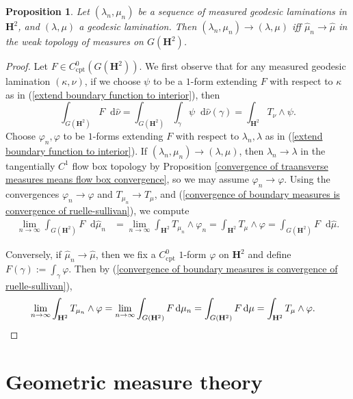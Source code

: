 \documentclass[reqno,11pt]{amsart}
\newcommand{\Hyp}{\mathbf H}
\newcommand*\dif{\mathop{}\!\mathrm{d}}
\newcommand{\cpt}{\mathrm{cpt}}
\newtheorem{proposition}[theorem]{Proposition}
\theoremstyle{definition}
\numberwithin{equation}{section}
\begin{document}
\begin{proposition}
Let $(\lambda_n, \mu_n)$ be a sequence of measured geodesic laminations in $\Hyp^2$, and $(\lambda, \mu)$ a geodesic lamination.
Then $(\lambda_n, \mu_n) \to (\lambda, \mu)$ iff $\hat \mu_n \to \hat \mu$ in the weak topology of measures on $G(\Hyp^2)$.
\end{proposition}
\begin{proof}
Let $F \in C^0_\cpt(G(\Hyp^2))$.
We first observe that for any measured geodesic lamination $(\kappa, \nu)$, if we choose $\psi$ to be a $1$-form extending $F$ with respect to $\kappa$ as in (\ref{extend boundary function to interior}), then 
\begin{equation}\label{convergence of boundary measures is convergence of ruelle-sullivan}
\int_{G(\Hyp^2)} F \dif \hat \nu = \int_{G(\Hyp^2)} \int_\gamma \psi \dif \hat \nu(\gamma) = \int_{\Hyp^2} T_\nu \wedge \psi.
\end{equation}
Choose $\varphi_n, \varphi$ to be $1$-forms extending $F$ with respect to $\lambda_n, \lambda$ as in (\ref{extend boundary function to interior}).
If $(\lambda_n, \mu_n) \to (\lambda, \mu)$, then $\lambda_n \to \lambda$ in the tangentially $C^1$ flow box topology by Proposition \ref{convergence of traansverse measures means flow box convergence}, so we may assume $\varphi_n \to \varphi$.
Using the convergences $\varphi_n \to \varphi$ and $T_{\mu_n} \to T_\mu$, and (\ref{convergence of boundary measures is convergence of ruelle-sullivan}), we compute 
\begin{align*}
\lim_{n \to \infty} \int_{G(\Hyp^2)} F \dif \hat \mu_n
&= \lim_{n \to \infty} \int_{\Hyp^2} T_{\mu_n} \wedge \varphi_n 
= \int_{\Hyp^2} T_\mu \wedge \varphi 
= \int_{G(\Hyp^2)} F \dif \hat \mu.
\end{align*}

Conversely, if $\hat \mu_n \to \hat \mu$, then we fix a $C^0_\cpt$ $1$-form $\varphi$ on $\Hyp^2$ and define $F(\gamma) := \int_\gamma \varphi$.
Then by (\ref{convergence of boundary measures is convergence of ruelle-sullivan}),
\begin{align*}
\lim_{n \to \infty} \int_{\Hyp^2} T_{\mu_n} \wedge \varphi
&= \lim_{n \to \infty} \int_{G(\Hyp^2)} F \dif \mu_n
= \int_{G(\Hyp^2)} F \dif \mu 
= \int_{\Hyp^2} T_\mu \wedge \varphi. \qedhere
\end{align*}
\end{proof}



\appendix 
\section{Geometric measure theory}\label{boundary appendix}
\end{document}

